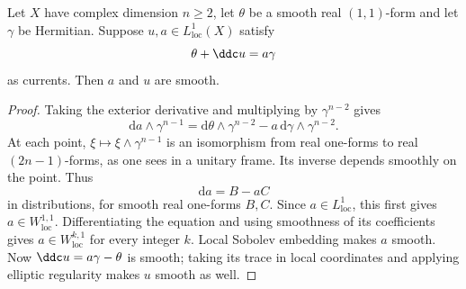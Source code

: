 \begin{lemma}\label{lem:smooth-conformal-current}
Let $X$ have complex dimension $n\geq2$, let $\theta$ be a smooth real $(1,1)$-form and let $\gamma$ be Hermitian. Suppose $u,a\in L^1_{\mathrm{loc}}(X)$ satisfy
\[
 \theta+\ddc u=a\gamma
\]
as currents. Then $a$ and $u$ are smooth.
\end{lemma}
\begin{proof}
Taking the exterior derivative and multiplying by $\gamma^{n-2}$ gives
\[
 \mathrm{d}a\wedge\gamma^{n-1}
 =\mathrm{d}\theta\wedge\gamma^{n-2}
      -a\,\mathrm{d}\gamma\wedge\gamma^{n-2}.
\]
At each point, $\xi\mapsto\xi\wedge\gamma^{n-1}$ is an isomorphism from real one-forms to real $(2n-1)$-forms, as one sees in a unitary frame. Its inverse depends smoothly on the point. Thus
\[
 \mathrm{d}a=B-aC
\]
in distributions, for smooth real one-forms $B,C$. Since $a\in L^1_{\mathrm{loc}}$, this first gives $a\in W^{1,1}_{\mathrm{loc}}$. Differentiating the equation and using smoothness of its coefficients gives $a\in W^{k,1}_{\mathrm{loc}}$ for every integer $k$. Local Sobolev embedding makes $a$ smooth. Now $\ddc u=a\gamma-\theta$ is smooth; taking its trace in local coordinates and applying elliptic regularity makes $u$ smooth as well.
\end{proof}

